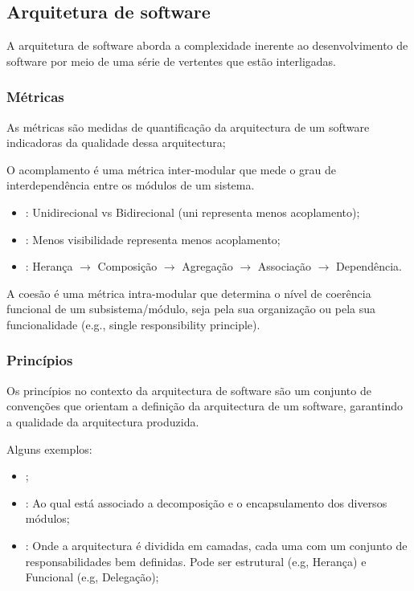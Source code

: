 \subsection{Arquitetura de software}\label{subsec:arquitetura-de-software}

A arquitetura de software aborda a complexidade inerente ao desenvolvimento de software por meio de uma série de vertentes que estão interligadas. 

\subsubsection{Métricas}\label{subsubsec:acoplamento}

As métricas são medidas de quantificação da arquitectura de um software indicadoras da qualidade dessa arquitectura;

O acomplamento é uma métrica inter-modular que mede o grau de interdependência entre os módulos de um sistema.
\begin{itemize}[topsep=0pt,itemsep=0pt,partopsep=0pt, parsep=0pt]
    \item {}: Unidirecional vs Bidirecional (uni representa menos acoplamento);
    \item {}: Menos visibilidade representa menos acoplamento;
    \item {}: Herança $\rightarrow$ Composição $\rightarrow$ Agregação $\rightarrow$ Associação $\rightarrow$ Dependência.
\end{itemize}

A coesão é uma métrica intra-modular que determina o nível de coerência funcional de um subsistema/módulo, seja pela sua organização ou pela sua funcionalidade (e.g., single responsibility principle).

\subsubsection{Princípios}\label{subsubsec:principios}

Os princípios no contexto da arquitectura de software são um conjunto de convenções que orientam a definição da arquitectura de um software, garantindo a qualidade da arquitectura produzida.

Alguns exemplos:
\begin{itemize}[topsep=0pt,itemsep=0pt,partopsep=0pt, parsep=0pt]
    \item {};
    \item {}: Ao qual está associado a decomposição e o encapsulamento dos diversos módulos;
    \item {}: Onde a arquitectura é dividida em camadas, cada uma com um conjunto de responsabilidades bem definidas. Pode ser estrutural (e.g, Herança) e Funcional (e.g, Delegação);
\end{itemize}
    
